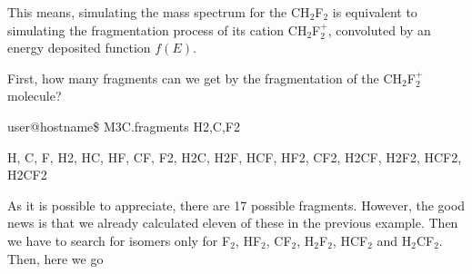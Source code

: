 \documentclass[a4paper,12pt]{article}
\begin{document}
This means, simulating the mass spectrum for the CH$_2$F$_2$ is equivalent to simulating the fragmentation process
of its cation CH$_2$F$_2^+$, convoluted by an energy deposited function $f(E)$.

First, how many fragments can we get by the fragmentation of the CH$_2$F$_2^+$ molecule?

\begin{shellexec}
user@hostname\$ M3C.fragments H2,C,F2

H, C, F, H2, HC, HF, CF, F2, H2C, H2F, HCF, HF2, CF2, H2CF, H2F2, HCF2, H2CF2
\end{shellexec}

As it is possible to appreciate, there are 17 possible fragments. However, the good news is that we already calculated eleven of these in the previous example.
Then we have to search for isomers only for F$_2$, HF$_2$, CF$_2$, H$_2$F$_2$, HCF$_2$ and H$_2$CF$_2$. Then, here we go
\end{document}
